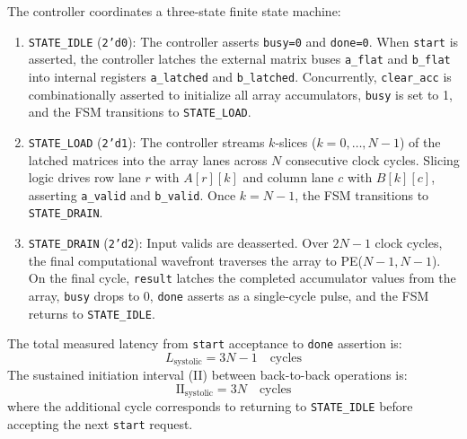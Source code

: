 \documentclass[conference]{IEEEtran}
\begin{document}
The controller coordinates a three-state finite state machine:
\begin{enumerate}
    \item \texttt{STATE\_IDLE} (\texttt{2'd0}): The controller asserts \texttt{busy=0} and \texttt{done=0}. When \texttt{start} is asserted, the controller latches the external matrix buses \texttt{a\_flat} and \texttt{b\_flat} into internal registers \texttt{a\_latched} and \texttt{b\_latched}. Concurrently, \texttt{clear\_acc} is combinationally asserted to initialize all array accumulators, \texttt{busy} is set to 1, and the FSM transitions to \texttt{STATE\_LOAD}.
    \item \texttt{STATE\_LOAD} (\texttt{2'd1}): The controller streams $k$-slices ($k = 0, \dots, N-1$) of the latched matrices into the array lanes across $N$ consecutive clock cycles. Slicing logic drives row lane $r$ with $A[r][k]$ and column lane $c$ with $B[k][c]$, asserting \texttt{a\_valid} and \texttt{b\_valid}. Once $k = N-1$, the FSM transitions to \texttt{STATE\_DRAIN}.
    \item \texttt{STATE\_DRAIN} (\texttt{2'd2}): Input valids are deasserted. Over $2N-1$ clock cycles, the final computational wavefront traverses the array to PE($N-1, N-1$). On the final cycle, \texttt{result} latches the completed accumulator values from the array, \texttt{busy} drops to 0, \texttt{done} asserts as a single-cycle pulse, and the FSM returns to \texttt{STATE\_IDLE}.
\end{enumerate}

The total measured latency from \texttt{start} acceptance to \texttt{done} assertion is:
\begin{equation}
L_{\text{systolic}} = 3N - 1 \quad \text{cycles}
\end{equation}
The sustained initiation interval (II) between back-to-back operations is:
\begin{equation}
\text{II}_{\text{systolic}} = 3N \quad \text{cycles}
\end{equation}
where the additional cycle corresponds to returning to \texttt{STATE\_IDLE} before accepting the next \texttt{start} request.
\end{document}
